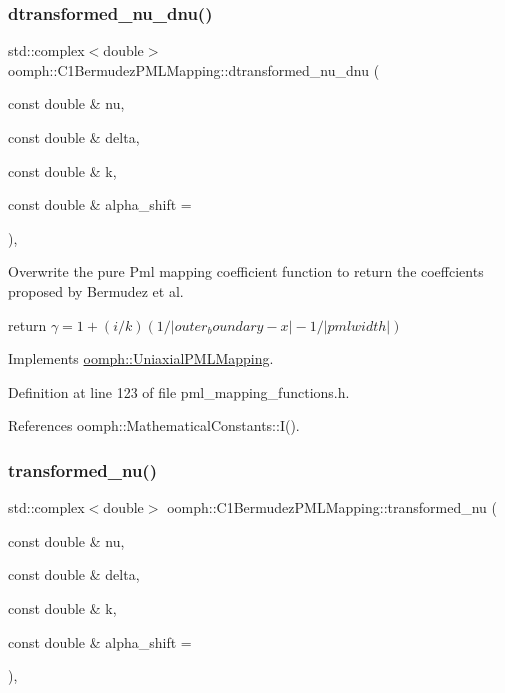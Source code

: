 \subsubsection{\texorpdfstring{dtransformed\+\_\+nu\+\_\+dnu()}{dtransformed\_nu\_dnu()}}
{\footnotesize\ttfamily std\+::complex$<$double$>$ oomph\+::\+C1\+Bermudez\+P\+M\+L\+Mapping\+::dtransformed\+\_\+nu\+\_\+dnu (\begin{DoxyParamCaption}\item[{const double \&}]{nu,  }\item[{const double \&}]{delta,  }\item[{const double \&}]{k,  }\item[{const double \&}]{alpha\+\_\+shift = {} }\end{DoxyParamCaption})\hspace{0.3cm}{\ttfamily [inline]}, {\ttfamily [virtual]}}



Overwrite the pure Pml mapping coefficient function to return the coeffcients proposed by Bermudez et al. 

return $\gamma=1 + (i/k)(1/|outer_boundary - x|-1/|pml width|)$ 

Implements \hyperlink{classoomph_1_1UniaxialPMLMapping_a2062b54207f13512fd3d9b901c882d44}{oomph\+::\+Uniaxial\+P\+M\+L\+Mapping}.



Definition at line 123 of file pml\+\_\+mapping\+\_\+functions.\+h.



References oomph\+::\+Mathematical\+Constants\+::\+I().

\mbox{\label{classoomph_1_1C1BermudezPMLMapping_a98426cf080db910b65f103696455d8b1}} 
\subsubsection{\texorpdfstring{transformed\+\_\+nu()}{transformed\_nu()}}
{\footnotesize\ttfamily std\+::complex$<$double$>$ oomph\+::\+C1\+Bermudez\+P\+M\+L\+Mapping\+::transformed\+\_\+nu (\begin{DoxyParamCaption}\item[{const double \&}]{nu,  }\item[{const double \&}]{delta,  }\item[{const double \&}]{k,  }\item[{const double \&}]{alpha\+\_\+shift = {} }\end{DoxyParamCaption})\hspace{0.3cm}{\ttfamily [inline]}, {\ttfamily [virtual]}}



